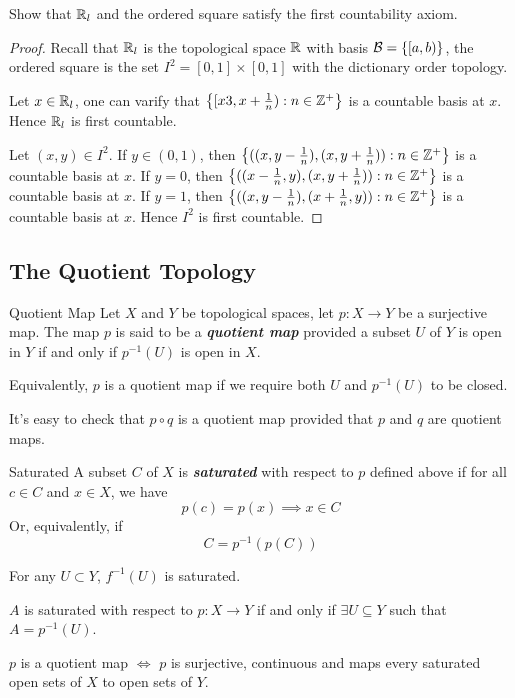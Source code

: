 \documentclass[12pt,a4paper]{article}
\begin{document}
    \begin{ex}
        Show that $\mathbb{R}_l$ and the ordered square satisfy the first countability axiom.
    \end{ex}
    \begin{proof}
        Recall that $\mathbb{R}_l$ is the topological space $\mathbb{R}$ with basis $\mathcal{B}=\left\{[a,b)\right\}$, the ordered square is the set $I^2=[0,1]\times[0,1]$ with the dictionary order topology.
        \vspace{0.5em}

        Let $x\in\mathbb{R}_l$, one can varify that $\left\{[x3,x+\frac{1}{n}): n\in \mathbb{Z}^+\right\}$ is a countable basis at $x$. Hence $\mathbb{R}_l$ is first countable.
        \vspace{0.5em}

        Let $(x,y)\in I^2$. If $y\in(0,1)$, then $\left\{((x,y-\frac{1}{n}),(x,y+\frac{1}{n})):n\in\mathbb{Z}^+\right\}$ is a countable basis at $x$. If $y=0$, then $\left\{((x-\frac{1}{n},y),(x,y+\frac{1}{n})):n\in\mathbb{Z}^+\right\}$ is a countable basis at $x$. If $y=1$, then $\left\{((x,y-\frac{1}{n}),(x+\frac{1}{n},y)):n\in\mathbb{Z}^+\right\}$ is a countable basis at $x$. Hence $I^2$ is first countable.
    \end{proof}
    \hfill

    \subsection{The Quotient Topology}
    \begin{defi}{Quotient Map}
        Let $X$ and $Y$ be topological spaces, let $p:X\to Y$ be a surjective map. The map $p$ is said to be a \textbf{\textit{quotient map}} provided a subset $U$ of $Y$ is open in $Y$ if and only if $p^{-1}(U)$ is open in $X$. 
    \end{defi}
    \begin{remark}
        Equivalently, $p$ is a quotient map if we require both $U$ and $p^{-1}(U)$ to be closed. 
    \end{remark}
    \begin{remark}
        It's easy to check that $p\circ q$ is a quotient map provided that $p$ and $q$ are quotient maps.
    \end{remark}
    \hfill

    \begin{defi}{Saturated}
        A subset $C$ of $X$ is \textbf{\textit{saturated}} with respect to $p$ defined above if for all $c\in C$ and $x\in X$, we have
        $$
        p(c)=p(x)\implies x\in C
        $$
        Or, equivalently, if
        $$
        C=p^{-1}(p(C))
        $$
    \end{defi}
    \begin{remark}
        For any $U\subset Y$, $f^{-1}(U)$ is saturated.
    \end{remark}
    \begin{remark}
        $A$ is saturated with respect to $p: X\to Y$ if and only if $\exists U\subseteq Y$ such that $A=p^{-1}(U)$.
    \end{remark}
    \begin{remark}
        $p$ is a quotient map $\iff$ $p$ is surjective, continuous and maps every saturated open sets of $X$ to open sets of $Y$.
    \end{remark}
    \hfill
\end{document}

